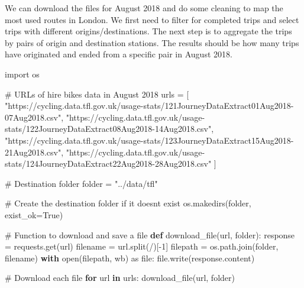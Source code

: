 \documentclass[
  letterpaper,
  DIV=11,
  numbers=noendperiod]{scrreprt}
\newenvironment{Shaded}{\begin{snugshade}}{\end{snugshade}}
\newcommand{\BuiltInTok}[1]{\textcolor[rgb]{0.00,0.23,0.31}{#1}}
\newcommand{\CommentTok}[1]{\textcolor[rgb]{0.37,0.37,0.37}{#1}}
\newcommand{\ControlFlowTok}[1]{\textcolor[rgb]{0.00,0.23,0.31}{\textbf{#1}}}
\newcommand{\DecValTok}[1]{\textcolor[rgb]{0.68,0.00,0.00}{#1}}
\newcommand{\ImportTok}[1]{\textcolor[rgb]{0.00,0.46,0.62}{#1}}
\newcommand{\KeywordTok}[1]{\textcolor[rgb]{0.00,0.23,0.31}{\textbf{#1}}}
\newcommand{\NormalTok}[1]{\textcolor[rgb]{0.00,0.23,0.31}{#1}}
\newcommand{\OperatorTok}[1]{\textcolor[rgb]{0.37,0.37,0.37}{#1}}
\newcommand{\StringTok}[1]{\textcolor[rgb]{0.13,0.47,0.30}{#1}}
\newcommand{\VariableTok}[1]{\textcolor[rgb]{0.07,0.07,0.07}{#1}}
\begin{document}
We can download the files for August 2018 and do some cleaning to map
the most used routes in London. We first need to filter for completed
trips and select trips with different origins/destinations. The next
step is to aggregate the trips by pairs of origin and destination
stations. The results should be how many trips have originated and ended
from a specific pair in August 2018.

\begin{Shaded}
\begin{Highlighting}[]
\ImportTok{import}\NormalTok{ os}

\CommentTok{\# URLs of hire bikes data in August 2018}
\NormalTok{urls }\OperatorTok{=}\NormalTok{ [}
    \StringTok{"https://cycling.data.tfl.gov.uk/usage{-}stats/121JourneyDataExtract01Aug2018{-}07Aug2018.csv"}\NormalTok{,}
    \StringTok{"https://cycling.data.tfl.gov.uk/usage{-}stats/122JourneyDataExtract08Aug2018{-}14Aug2018.csv"}\NormalTok{,}
    \StringTok{"https://cycling.data.tfl.gov.uk/usage{-}stats/123JourneyDataExtract15Aug2018{-}21Aug2018.csv"}\NormalTok{,}
    \StringTok{"https://cycling.data.tfl.gov.uk/usage{-}stats/124JourneyDataExtract22Aug2018{-}28Aug2018.csv"}
\NormalTok{    ]}

\CommentTok{\# Destination folder}
\NormalTok{folder }\OperatorTok{=} \StringTok{"../data/tfl"}

\CommentTok{\# Create the destination folder if it doesn\textquotesingle{}t exist}
\NormalTok{os.makedirs(folder, exist\_ok}\OperatorTok{=}\VariableTok{True}\NormalTok{)}

\CommentTok{\# Function to download and save a file}
\KeywordTok{def}\NormalTok{ download\_file(url, folder):}
\NormalTok{    response }\OperatorTok{=}\NormalTok{ requests.get(url)}
\NormalTok{    filename }\OperatorTok{=}\NormalTok{ url.split(}\StringTok{\textquotesingle{}/\textquotesingle{}}\NormalTok{)[}\OperatorTok{{-}}\DecValTok{1}\NormalTok{]}
\NormalTok{    filepath }\OperatorTok{=}\NormalTok{ os.path.join(folder, filename)}
    \ControlFlowTok{with} \BuiltInTok{open}\NormalTok{(filepath, }\StringTok{\textquotesingle{}wb\textquotesingle{}}\NormalTok{) }\ImportTok{as} \BuiltInTok{file}\NormalTok{:}
        \BuiltInTok{file}\NormalTok{.write(response.content)}

\CommentTok{\# Download each file}
\ControlFlowTok{for}\NormalTok{ url }\KeywordTok{in}\NormalTok{ urls:}
\NormalTok{    download\_file(url, folder)}
\end{Highlighting}
\end{Shaded}
\end{document}
